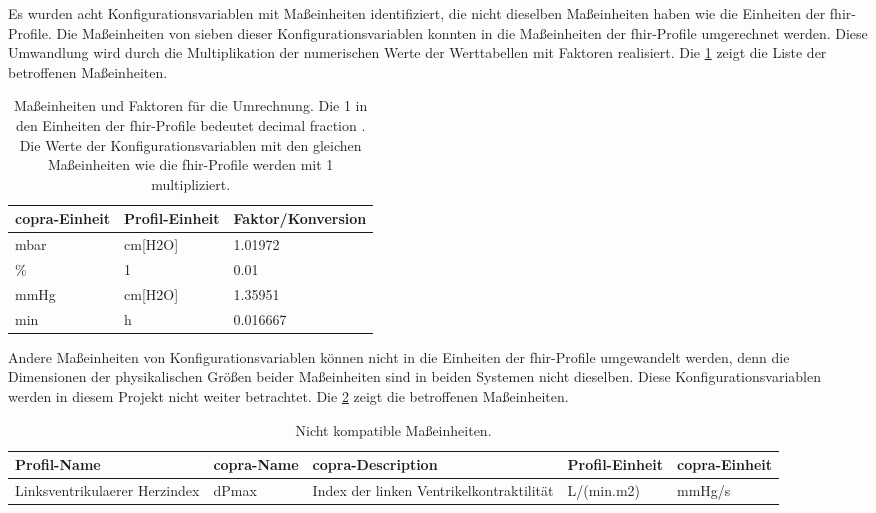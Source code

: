 Es wurden acht Konfigurationsvariablen mit Maßeinheiten identifiziert, die nicht dieselben Maßeinheiten haben wie die Einheiten der \ac{fhir}-Profile. Die Maßeinheiten von sieben dieser Konfigurationsvariablen konnten in die Maßeinheiten der \ac{fhir}-Profile umgerechnet werden. Diese Umwandlung wird durch die Multiplikation der numerischen Werte der Werttabellen mit Faktoren realisiert. Die \ref{tab:unittoconvert} zeigt die Liste der betroffenen Maßeinheiten.  

\clearpage

\begin{table}[ht]
	\centering
	\caption[Maßeinheiten und Faktoren zur Umrechnung]{Maßeinheiten und Faktoren für die Umrechnung. Die 1 in den Einheiten der \ac{fhir}-Profile bedeutet \glqq decimal fraction\grqq{} \cite{unitsloinc}. Die Werte der Konfigurationsvariablen mit den gleichen Maßeinheiten wie die \ac{fhir}-Profile werden mit 1 multipliziert.}
	\label{tab:unittoconvert}
	\begin{tabular}{|l|l|l|} \hline
		\bfseries \ac{copra}-Einheit & \bfseries Profil-Einheit & \bfseries Faktor/Konversion \\ \hline
		mbar & cm[H2O] & 1.01972 \\ \hline
		\% & 1 & 0.01 \\ \hline
		mmHg & cm[H2O] & 1.35951 \\ \hline
		min & h & 0.016667 \\ \hline
	\end{tabular}
\end{table}

Andere Maßeinheiten von Konfigurationsvariablen können nicht in die Einheiten der \ac{fhir}-Profile umgewandelt werden, denn die Dimensionen der physikalischen Größen beider Maßeinheiten sind in beiden Systemen nicht dieselben. Diese Konfigurationsvariablen werden in diesem Projekt nicht weiter betrachtet. Die \ref{tab:unitnocompat} zeigt die betroffenen Maßeinheiten. 

\begin{table}[ht]
	\centering
	\caption[Nicht kompatible Maßeinheiten]{Nicht kompatible Maßeinheiten.}
	\label{tab:unitnocompat}
	\begin{tabular}{|p{3.3cm}|p{1.7cm}|p{2.6cm}|p{2cm}|p{1.8cm}|} \hline
		\bfseries Profil-Name & \bfseries \ac{copra}-Name & \bfseries \ac{copra}-Description & \bfseries Profil-Einheit & \bfseries \ac{copra}-Einheit \\ \hline
		Linksventrikulaerer Herzindex & dPmax & Index der linken Ventrikelkontraktilität & L/(min.m2) & mmHg/s \\ \hline
	\end{tabular}
\end{table}

